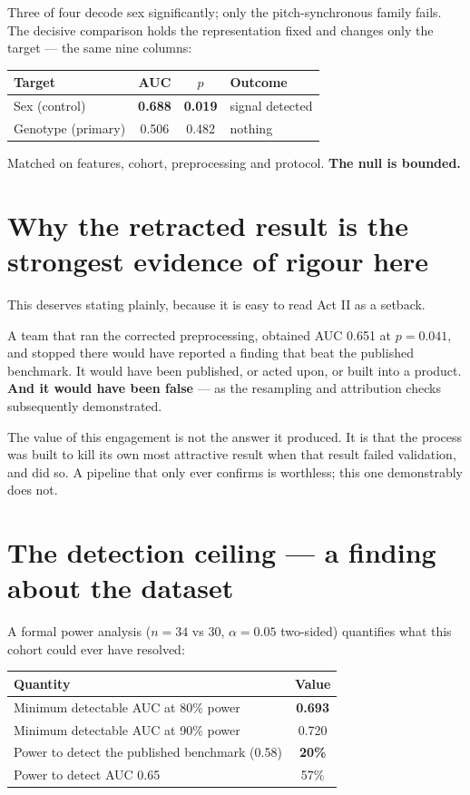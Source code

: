 \documentclass[11pt]{article}
\begin{document}
Three of four decode sex significantly; only the pitch-synchronous family fails.
The decisive comparison holds the representation fixed and changes only the
target --- the same nine columns:

\begin{table}[h]\centering
\begin{tabular}{lccl}
\toprule
Target & AUC & $p$ & Outcome \\
\midrule
Sex (control) & \textbf{0.688} & \textbf{0.019} & signal detected \\
Genotype (primary) & 0.506 & 0.482 & nothing \\
\bottomrule
\end{tabular}
\end{table}

Matched on features, cohort, preprocessing and protocol. \textbf{The null is
bounded.}

\section{Why the retracted result is the strongest evidence of rigour here}

This deserves stating plainly, because it is easy to read Act II as a setback.

A team that ran the corrected preprocessing, obtained AUC 0.651 at $p = 0.041$,
and stopped there would have reported a finding that beat the published
benchmark. It would have been published, or acted upon, or built into a product.
\textbf{And it would have been false} --- as the resampling and attribution
checks subsequently demonstrated.

The value of this engagement is not the answer it produced. It is that the
process was built to kill its own most attractive result when that result failed
validation, and did so. A pipeline that only ever confirms is worthless; this one
demonstrably does not.

\section{The detection ceiling --- a finding about the dataset}

A formal power analysis ($n = 34$ vs 30, $\alpha = 0.05$ two-sided) quantifies
what this cohort could ever have resolved:

\begin{table}[h]\centering
\begin{tabular}{lc}
\toprule
Quantity & Value \\
\midrule
Minimum detectable AUC at 80\% power & \textbf{0.693} \\
Minimum detectable AUC at 90\% power & 0.720 \\
Power to detect the published benchmark (0.58) & \textbf{20\%} \\
Power to detect AUC 0.65 & 57\% \\
\bottomrule
\end{tabular}
\end{table}
\end{document}

